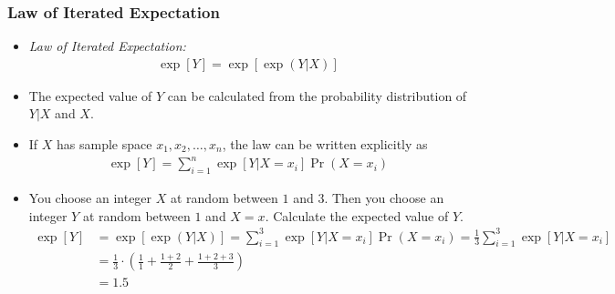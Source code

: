 

\begin{frame}
\frametitle{Law of Iterated Expectation}
\begin{itemize}  
\item \emph{Law of Iterated Expectation:}
\begin{align*}
\exp[Y] = \exp[\exp(Y|X)]
\end{align*}
\item The expected value of $Y$ can be calculated from the probability distribution of $Y|X$ and $X$.
\item If $X$ has sample space $x_1, x_2, \ldots, x_n$, the law can be written explicitly as
\begin{align*}
\exp[Y] = \sum_{i=1}^n \exp[Y|X=x_i] \Pr(X=x_i)
\end{align*}
\item You choose an integer $X$ at random between $1$ and $3$. Then you choose an integer $Y$ at random between $1$ and $X=x$. Calculate the expected value of $Y$. 
\begin{align*}
\exp[Y] 
  & = \exp[\exp(Y|X)]
    = \sum_{i=1}^{3} \exp[Y|X=x_i] \Pr(X=x_i)
    = \frac{1}{3} \sum_{i=1}^{3} \exp[Y|X=x_i]\\
  & = \frac{1}{3} \cdot \left(\frac{1}{1} 
  + \frac{1+2}{2} 
  + \frac{1+2+3}{3}
  \right)\\
  & = 1.5
\end{align*}
\end{itemize}
\end{frame}
